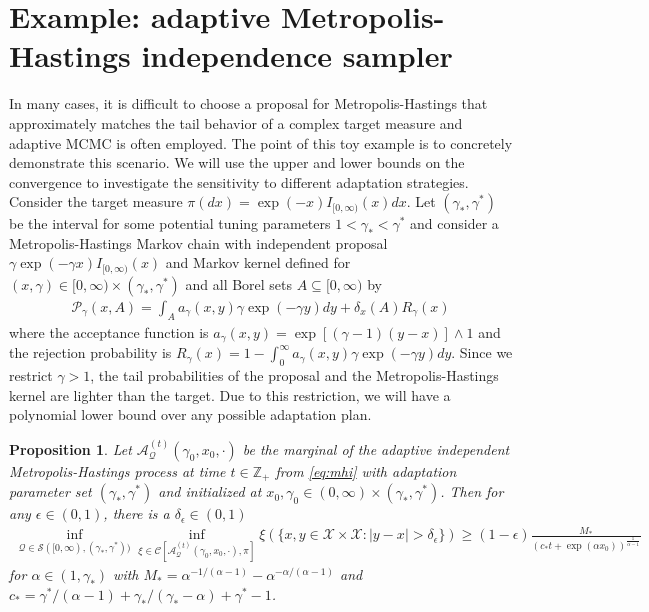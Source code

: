 \documentclass[12pt]{article}
\theoremstyle{plain}
\newtheorem{proposition}[theorem]{Proposition}
\theoremstyle{remark}
\newcommand{\e}{\epsilon}
\newcommand{\Z}{\mathbb{Z}}
\newcommand{\Q}{\mathcal{Q}}
\renewcommand{\P}{\mathcal{P}}
\newcommand{\A}{\mathcal{A}}
\newcommand{\X}{\mathcal{X}}
\newcommand{\C}{\mathcal{C}}
\renewcommand{\S}{\mathcal{S}}
\begin{document}
\section{Example: adaptive Metropolis-Hastings independence sampler}
\label{section:toy_example}

In many cases, it is difficult to choose a proposal for Metropolis-Hastings that approximately matches the tail behavior of a complex target measure \citep{schmidler:woodard:2011} and adaptive MCMC is often employed.
The point of this toy example is to concretely demonstrate this scenario. 
We will use the upper and lower bounds on the convergence to investigate the sensitivity to different adaptation strategies.
Consider the target measure $\pi(dx) = \exp(-x) I_{[0, \infty)}(x) dx$.
Let $(\gamma_*, \gamma^*)$ be the interval for some potential tuning parameters $1 < \gamma_* <  \gamma^*$ and consider a Metropolis-Hastings Markov chain with independent proposal
$
\gamma \exp(-\gamma x) I_{[0, \infty)}(x)
$
and Markov kernel defined for $(x, \gamma) \in [0, \infty) \times (\gamma_*, \gamma^*)$ and all Borel sets $A \subseteq [0, \infty)$ by
\begin{align}
\P_\gamma(x, A)
= \int_A a_\gamma(x, y) \gamma \exp(-\gamma y) dy
+ \delta_{x}(A) R_\gamma(x)
\label{eq:mhi}
\end{align}
where the acceptance function is $a_\gamma(x, y) = \exp\left[ (\gamma - 1) (y - x) \right] \wedge 1$ and the rejection probability is $R_\gamma(x) = 1 - \int_0^\infty a_\gamma(x, y) \gamma \exp(-\gamma y) dy$.
Since we restrict $\gamma > 1$, the tail probabilities of the proposal and the Metropolis-Hastings kernel are lighter than the target.
Due to this restriction, we will have a polynomial lower bound over any possible adaptation plan.

\begin{proposition}
\label{proposition:lb_imh}
Let $\A_{\Q}^{(t)}(\gamma_0, x_0, \cdot)$ be the marginal of the adaptive independent Metropolis-Hastings process at time $t \in \Z_+$ from \eqref{eq:mhi} with adaptation parameter set $(\gamma_*, \gamma^*)$ and initialized at $x_0, \gamma_0 \in (0, \infty) \times (\gamma_*, \gamma^*)$.
Then for any $\e \in (0, 1)$, there is a $\delta_{\e} \in (0, 1)$
\begin{align*}
\inf_{\Q \in \S([0, \infty), (\gamma_*, \gamma^*)) } \inf_{\xi \in \C\left[ \A_{\Q}^{(t)}(\gamma_0, x_0, \cdot), \pi \right] } \xi( \{ x, y \in \X \times \X : |y - x| > \delta_{\e} \})
\ge (1 - \e) \frac{M_*}{ \left( c_* t + \exp(\alpha x_0) \right)^{\frac{1}{\alpha - 1}} }
\end{align*}
for $\alpha \in (1, \gamma_*)$ with $M_* = \alpha^{-1/(\alpha - 1)} - \alpha^{-\alpha/(\alpha - 1)}$ and $c_{*} = \gamma^* / (\alpha - 1)
+ \gamma_* / (\gamma_* - \alpha)
+ \gamma^* - 1$.
\end{proposition}
\end{document}
